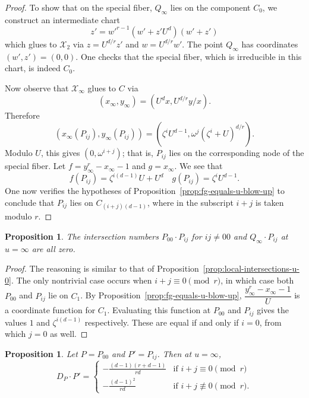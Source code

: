 \documentclass[reqno]{amsart}
\newtheorem{proposition}[thm]{Proposition}
\theoremstyle{definition}
\theoremstyle{remark}
\def\XX{\mathcal{X}}
\newcommand{\sxi}{\mathcal{X}_\infty}
\begin{document}
\begin{proof}
To show that on the special fiber, $Q_\infty$ lies on the component $C_0$, we construct an intermediate chart
  \[
  z' = w'^{r-1}(w'+z'U^d)(w'+z')
  \]
  which glues to $\XX_2$ via $z = U^{d/r} z'$ and $w = U^{d/r} w'$. The point $Q_\infty$ has coordinates $(w', z') = (0,0)$. One checks that the special fiber, which is irreducible in this chart, is indeed $C_0$.

  Now observe that $\sxi$ glues to $C$ via
  \[
  (x_\infty, y_\infty) = (U^d x, U^{d/r} y/x).
  \]
  Therefore
  \[
  (x_\infty(P_{ij}), y_\infty(P_{ij})) = (\zeta^i U^{d-1}, \omega^j (\zeta^i + U)^{d/r}).
  \]
  Modulo $U$, this gives $(0,\omega^{i+j})$; that is, $P_{ij}$ lies on the corresponding node of the special fiber. Let $f = y_\infty^r - x_\infty - 1$ and $g = x_\infty$. We see that 
  \[
  f(P_{ij}) = \zeta^{i(d-1)} U + U^d \quad g(P_{ij}) = \zeta^i U^{d-1}.
  \]
  One now verifies the hypotheses of Proposition~\ref{prop:fg-equals-u-blow-up} to conclude that $P_{ij}$ lies on $C_{(i+j)(d-1)}$, where in the subscript $i+j$ is taken modulo $r$.
\end{proof}

\begin{proposition}\label{prop:local-intersections-u-infty}
  The intersection numbers $P_{00} \cdot P_{ij}$ for $ij \neq 00$ and $Q_{\infty} \cdot P_{ij}$ at $u = \infty$ are all zero.
\end{proposition}

\begin{proof}
  The reasoning is similar to that of Proposition~\ref{prop:local-intersections-u-0}. The only nontrivial case occurs when $i+j \equiv 0 \pmod{r}$, in which case both $P_{00}$ and $P_{ij}$ lie on $C_1$. By Proposition~\ref{prop:fg-equals-u-blow-up}, $\dfrac{y_\infty^r - x_\infty - 1}{U}$ is a coordinate function for $C_1$. Evaluating this function at $P_{00}$ and $P_{ij}$ gives the values $1$ and $\zeta^{i(d-1)}$ respectively. These are equal if and only if $i = 0$, from which $j = 0$ as well.
\end{proof}

\begin{proposition}\label{prop:dp-u-infty}
  Let $P = P_{00}$ and $P' = P_{ij}$. Then at $u = \infty$,
\[
D_P \cdot P' =
\begin{cases}
  -\frac{(d-1)(r+d-1)}{rd} & \text{if } i+j \equiv 0 \pmod{r} \\
  -\frac{(d-1)^2}{rd} & \text{if } i+j \not\equiv 0 \pmod{r}.
\end{cases}
\]
\end{proposition}
\end{document}
